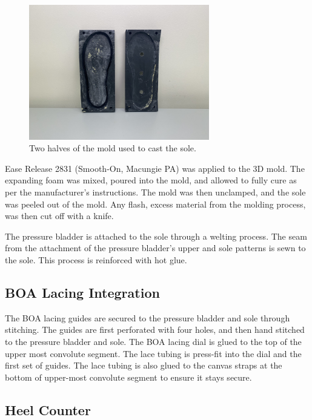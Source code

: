 \documentclass[defaultstyle,11pt]{comps}
\begin{document}
\begin{figure}
\hypertarget{fig:SA3-solemoldhalves}{%
\centering
\includegraphics[width=0.7\textwidth,height=\textheight]{../fig/SA3/Sole_Mold.jpg}
\caption{Two halves of the mold used to cast the sole.}\label{fig:SA3-solemoldhalves}
}
\end{figure}

Ease Release 2831 (Smooth-On, Macungie PA) was applied to the 3D mold.
The expanding foam was mixed, poured into the mold, and allowed to fully cure as per the manufacturer's instructions.
The mold was then unclamped, and the sole was peeled out of the mold.
Any flash, excess material from the molding process, was then cut off with a knife.

The pressure bladder is attached to the sole through a welting process.
The seam from the attachment of the pressure bladder's upper and sole patterns is sewn to the sole.
This process is reinforced with hot glue.

\hypertarget{boa-lacing-integration}{%
\subsection{BOA Lacing Integration}\label{boa-lacing-integration}}

The BOA lacing guides are secured to the pressure bladder and sole through stitching.
The guides are first perforated with four holes, and then hand stitched to the pressure bladder and sole.
The BOA lacing dial is glued to the top of the upper most convolute segment.
The lace tubing is press-fit into the dial and the first set of guides.
The lace tubing is also glued to the canvas straps at the bottom of upper-most convolute segment to ensure it stays secure.

\hypertarget{heel-counter-1}{%
\subsection{Heel Counter}\label{heel-counter-1}}
\end{document}
